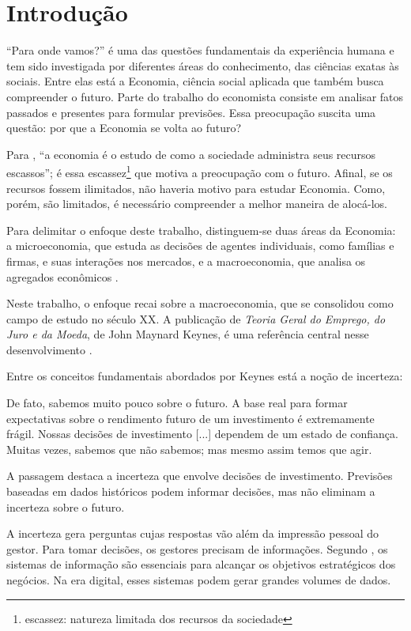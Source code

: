 \chapter{Introdução}
\label{cap:introducao}

	“Para onde vamos?” é uma das questões fundamentais da experiência humana e tem sido investigada por diferentes áreas do conhecimento, das ciências exatas às sociais. Entre elas está a Economia, ciência social aplicada que também busca compreender o futuro. Parte do trabalho do economista consiste em analisar fatos passados e presentes para formular previsões. Essa preocupação suscita uma questão: por que a Economia se volta ao futuro?

Para , “a economia é o estudo de como a sociedade administra seus recursos escassos”; é essa escassez\footnote{escassez: natureza limitada dos recursos da sociedade } que motiva a preocupação com o futuro. Afinal, se os recursos fossem ilimitados, não haveria motivo para estudar Economia. Como, porém, são limitados, é necessário compreender a melhor maneira de alocá-los.

Para delimitar o enfoque deste trabalho, distinguem-se duas áreas da Economia: a microeconomia, que estuda as decisões de agentes individuais, como famílias e firmas, e suas interações nos mercados, e a macroeconomia, que analisa os agregados econômicos .

Neste trabalho, o enfoque recai sobre a macroeconomia, que se consolidou como campo de estudo no século XX. A publicação de \textit{Teoria Geral do Emprego, do Juro e da Moeda}, de John Maynard Keynes, é uma referência central nesse desenvolvimento \citeyear{KEYNES1936}.


Entre os conceitos fundamentais abordados por Keynes está a noção de incerteza:
\begin{citacao}
	De fato, sabemos muito pouco sobre o futuro. A base real para formar expectativas sobre o rendimento futuro de um investimento é extremamente frágil. Nossas decisões de investimento [...] dependem de um estado de confiança. Muitas vezes, sabemos que não sabemos; mas mesmo assim temos que agir. 
\end{citacao}
A passagem destaca a incerteza que envolve decisões de investimento. Previsões baseadas em dados históricos podem informar decisões, mas não eliminam a incerteza sobre o futuro.


A incerteza gera perguntas cujas respostas vão além da impressão pessoal do gestor. Para tomar decisões, os gestores precisam de informações. Segundo , os sistemas de informação são essenciais para alcançar os objetivos estratégicos dos negócios. Na era digital, esses sistemas podem gerar grandes volumes de dados.

